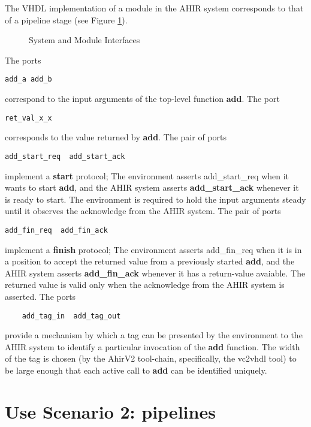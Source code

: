 The VHDL implementation of a module in the AHIR system
corresponds to that of a pipeline stage (see Figure \ref{fig:ModulePipeline}).
\begin{figure}
\begin{centering}
\centerline{}
\caption{System and Module Interfaces}
 \label{fig:ModulePipeline}
\end{centering}
\end{figure}
The ports 
\begin{verbatim}
add_a add_b
\end{verbatim}
correspond to the input arguments of the top-level 
function {\bf add}.  The port 
\begin{verbatim}
ret_val_x_x
\end{verbatim}
corresponds to the value returned by {\bf add}.
The pair of ports
\begin{verbatim}
add_start_req  add_start_ack
\end{verbatim}
implement a {\bf start} protocol; The environment
asserts {add\_start\_req} when it wants to start
{\bf add}, and the AHIR system asserts {\bf add\_start\_ack}
whenever it is ready to start.  The environment is required
to hold the input arguments steady until it observes
the acknowledge from the AHIR system.
The pair of ports
\begin{verbatim}
add_fin_req  add_fin_ack
\end{verbatim}
implement a {\bf finish} protocol; The environment
asserts {add\_fin\_req} when it is in a position to accept
the returned value from a previously started 
{\bf add}, and the AHIR system asserts {\bf add\_fin\_ack}
whenever it has a return-value avaiable.  The returned value
is valid only when the acknowledge from the AHIR system is
asserted. 
The ports
\begin{verbatim}
    add_tag_in  add_tag_out
\end{verbatim}
provide a mechanism by which a tag can be presented
by the environment to the AHIR system to identify
a particular invocation of the {\bf add} function.  The
width of the tag is chosen (by the AhirV2 tool-chain,
specifically, the vc2vhdl tool) to be large enough
that each active call to {\bf add} can be identified
uniquely.


\section{Use Scenario 2: pipelines}

